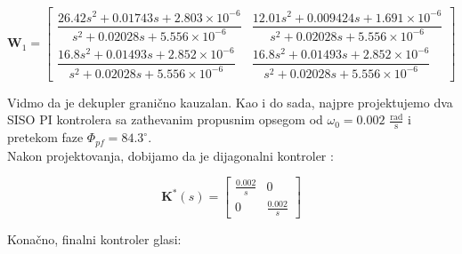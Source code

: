 \documentclass[a4paper,11pt]{article}
\theoremstyle{definition} \newtheorem{deff}{Definicija}[section]
\theoremstyle{definition} \newtheorem{prim}[deff]{Primer}
\theoremstyle{plain} \newtheorem{teor}[deff]{Teorema}
\begin{document}
		\vspace{1cm}
		\begin{equation}
			\textbf{W}_1 = \begin{bmatrix} 
				\dfrac{{26.42s^2 + 0.01743s + 2.803 \times 10^{-6}}}{{s^2 + 0.02028s + 5.556 \times 10^{-6}}} & \dfrac{{12.01s^2 + 0.009424s + 1.691 \times 10^{-6}}}{{s^2 + 0.02028s + 5.556 \times 10^{-6}}} \\
				\dfrac{{16.8s^2 + 0.01493s + 2.852 \times 10^{-6}}}{{s^2 + 0.02028s + 5.556 \times 10^{-6}}} & \dfrac{{16.8s^2 + 0.01493s + 2.852 \times 10^{-6}}}{{s^2 + 0.02028s + 5.556 \times 10^{-6}}}
			\end{bmatrix}
		\end{equation}
		
		\vspace{1cm}
		Vidmo da je dekupler granično kauzalan. Kao i do sada, najpre projektujemo dva SISO PI kontrolera sa zathevanim propusnim opsegom od $\omega_0 = 0.002$  $\frac{\text{rad}}{\text{s}}$ i pretekom faze  $\Phi_{pf} = 84.3 ^{\circ}$. \\
		
		Nakon projektovanja, dobijamo da je dijagonalni kontroler :
		
		\begin{equation}
			\textbf{K}^*(s) = \begin{bmatrix} \frac{{ 0.002}}{s} & 0 \\ 0 & \frac{0.002}{s} \end{bmatrix}
		\end{equation}
		
		\vspace{1cm}
		\noindent Konačno, finalni kontroler glasi:
		
		
			
\end{document}
